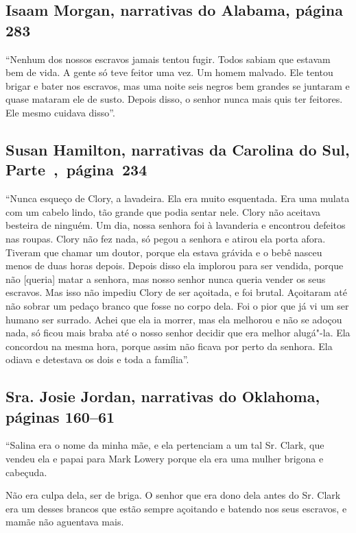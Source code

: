 \subsection{Isaam Morgan, narrativas do Alabama, página 283}
\label{ref201}

``Nenhum dos nossos escravos jamais tentou fugir. Todos sabiam que
estavam bem de vida. A gente só teve feitor uma vez. Um homem malvado.
Ele tentou brigar e bater nos escravos, mas uma noite seis negros bem
grandes se juntaram e quase mataram ele de susto. Depois disso, o senhor
nunca mais quis ter feitores. Ele mesmo cuidava disso''.

\subsection{Susan Hamilton, narrativas da Carolina do Sul, Parte~,~página~234}
\label{ref121}

``Nunca esqueço de Clory, a lavadeira. Ela era muito esquentada. Era uma
mulata com um cabelo lindo, tão grande que podia sentar nele. Clory não
aceitava besteira de ninguém. Um dia, nossa senhora foi à lavanderia e
encontrou defeitos nas roupas. Clory não fez nada, só pegou a senhora e
atirou ela porta afora. Tiveram que chamar um doutor, porque ela estava
grávida e o bebê nasceu menos de duas horas depois. Depois disso ela
implorou para ser vendida, porque não {[}queria{]} matar a senhora, mas
nosso senhor nunca queria vender os seus escravos. Mas isso não impediu
Clory de ser açoitada, e foi brutal. Açoitaram até não sobrar um pedaço
branco que fosse no corpo dela. Foi o pior que já vi um ser humano ser
surrado. Achei que ela ia morrer, mas ela melhorou e não se adoçou nada,
só ficou mais braba até o nosso senhor decidir que era melhor alugá"-la.
Ela concordou na mesma hora, porque assim não ficava por perto da
senhora. Ela odiava e detestava os dois e toda a família''.

\subsection{Sra. Josie Jordan, narrativas do Oklahoma, páginas 160--61}
\label{ref165}

``Salina era o nome da minha mãe, e ela pertenciam a um tal Sr. Clark,
que vendeu ela e papai para Mark Lowery porque ela era uma mulher
brigona e cabeçuda.

Não era culpa dela, ser de briga. O senhor que era dono dela antes do
Sr. Clark era um desses brancos que estão sempre açoitando e batendo nos
seus escravos, e mamãe não aguentava mais.

